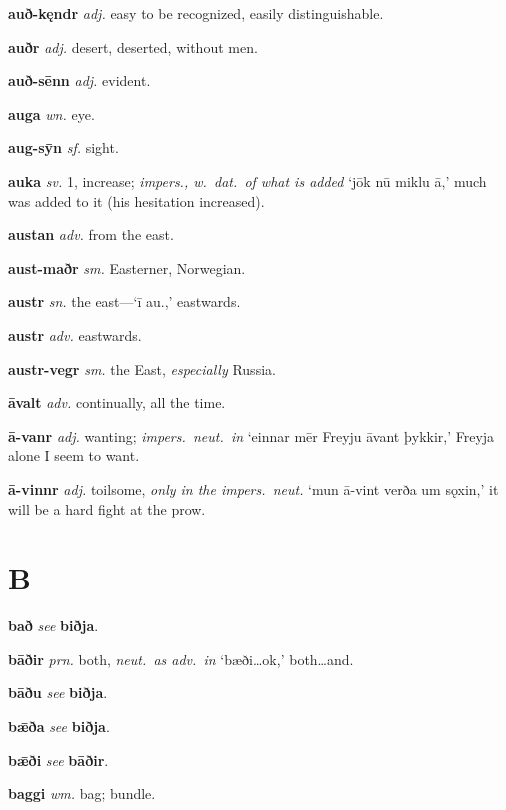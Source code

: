 \documentclass[12pt,letterpaper]{book}
\newcommand\emptypage{\clearpage{\pagestyle{empty}\cleardoublepage}}
\begin{document}
\noindent
\textbf{auð-kęndr} \textit{adj.} easy to be recognized, easily
	distinguishable.

\noindent
\textbf{auðr} \textit{adj.} desert, deserted, without men.

\noindent
\textbf{auð-sēnn} \textit{adj.} evident.

\noindent
\textbf{auga} \textit{wn.} eye.

\noindent
\textbf{aug-sȳn} \textit{sf.} sight.

\noindent
\textbf{auka} \textit{sv.} 1, increase; \textit{impers., w.\ dat.\ of what is
	added} `jōk nū miklu ā,' much was added to it (his hesitation
	increased).

\noindent
\textbf{austan} \textit{adv.} from the east.

\noindent
\textbf{aust-maðr} \textit{sm.} Easterner, Norwegian.

\noindent
\textbf{austr} \textit{sn.} the east---`ī au.,' eastwards.

\noindent
\textbf{austr} \textit{adv.} eastwards.

\noindent
\textbf{austr-vegr} \textit{sm.} the East, \textit{especially} Russia.

\noindent
\textbf{āvalt} \textit{adv.} continually, all the time.

\noindent
\textbf{ā-vanr} \textit{adj.} wanting; \textit{impers.\ neut.\ in} `einnar
	mēr Freyju āvant þykkir,' Freyja alone I seem to want.

\noindent
\textbf{ā-vinnr} \textit{adj.} toilsome, \textit{only in the impers.\ neut.}
	`mun ā-vint verða um sǫxin,' it will be a hard fight at the prow.

\emptypage

\chapter*{B}

\noindent
\textbf{bað} \textit{} \textit{see} \textbf{biðja}.

\noindent
\textbf{bāðir} \textit{prn.} both, \textit{neut.\ as adv.\ in} `bæði\ldots ok,'
	both\ldots and.

\noindent
\textbf{bāðu} \textit{} \textit{see} \textbf{biðja}.

\noindent
\textbf{bǣða} \textit{} \textit{see} \textbf{biðja}.

\noindent
\textbf{bǣði} \textit{} \textit{see} \textbf{bāðir}.

\noindent
\textbf{baggi} \textit{wm.} bag; bundle.
\end{document}
